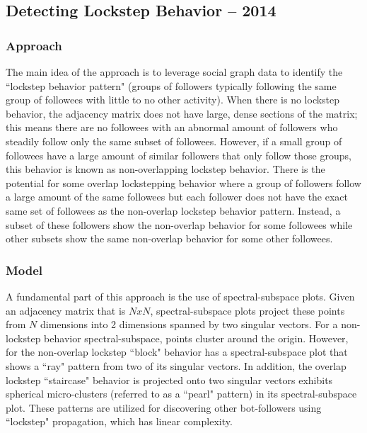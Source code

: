 \documentclass[11pt, oneside]{article}   	%
\begin{document}
\subsection*{Detecting Lockstep Behavior -- 2014}

\subsubsection*{Approach}

\quad The main idea of the approach is to leverage social graph data to identify the ``lockstep behavior pattern" (groups of followers typically following the same group of followees with little to no other activity).
When there is no lockstep behavior, the adjacency matrix does not have large, dense sections of the matrix; this means there are no followees with an abnormal amount of followers who steadily follow only the same subset of followees.
However, if a small group of followees have a large amount of similar followers that only follow those groups, this behavior is known as non-overlapping lockstep behavior.
There is the potential for some overlap lockstepping behavior where a group of followers follow a large amount of the same followees but each follower does not have the exact same set of followees as the non-overlap lockstep behavior pattern.
Instead, a subset of these followers show the non-overlap behavior for some followees while other subsets show the same non-overlap behavior for some other followees.

\subsubsection*{Model}

\quad A fundamental part of this approach is the use of spectral-subspace plots.
Given an adjacency matrix that is $NxN$, spectral-subspace plots project these points from $N$ dimensions into 2 dimensions spanned by two singular vectors.
For a non-lockstep behavior spectral-subspace, points cluster around the origin.
However, for the non-overlap lockstep ``block" behavior has a spectral-subspace plot that shows a ``ray" pattern from two of its singular vectors.
In addition, the overlap lockstep ``staircase" behavior is projected onto two singular vectors exhibits spherical micro-clusters (referred to as a ``pearl" pattern) in its spectral-subspace plot.
These patterns are utilized for discovering other bot-followers using ``lockstep" propagation, which has linear complexity.
\end{document}
